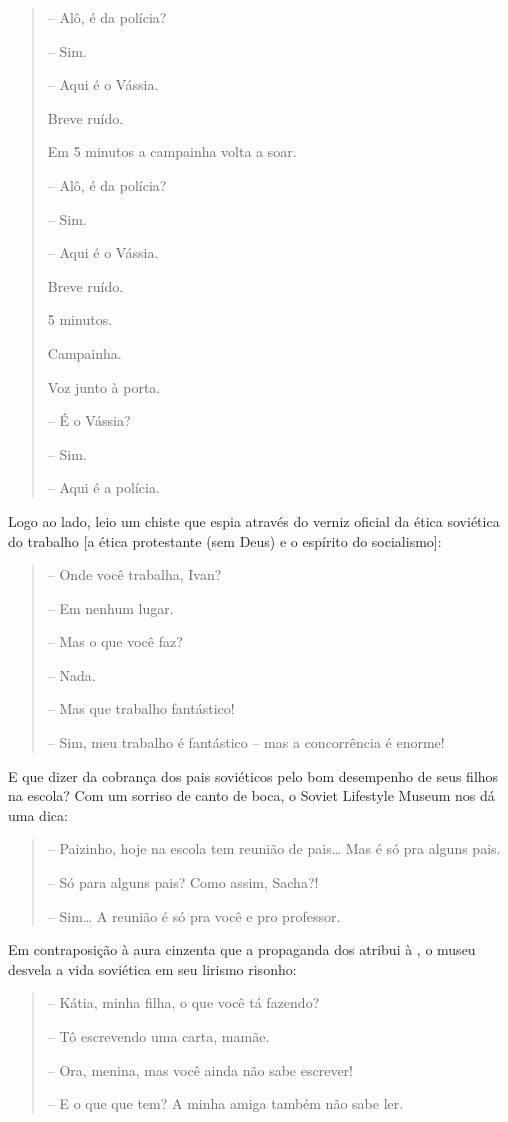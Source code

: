 \begin{quote}
\forceindent{}-- Alô, é da polícia?

-- Sim.

-- Aqui é o Vássia.

Breve ruído.

Em 5 minutos a campainha volta a soar.

-- Alô, é da polícia?

-- Sim.

-- Aqui é o Vássia.

Breve ruído.

5 minutos.

Campainha.

Voz junto à porta.

-- É o Vássia?

-- Sim.

-- Aqui é a polícia.
\end{quote}

Logo ao lado, leio um chiste que espia através do verniz oficial da
ética soviética do trabalho {[}a ética protestante (sem Deus) e o
espírito do socialismo{]}:

\begin{quote}
\forceindent{}-- Onde você trabalha, Ivan?

-- Em nenhum lugar.

-- Mas o que você faz?

-- Nada.

-- Mas que trabalho fantástico!

-- Sim, meu trabalho é fantástico -- mas a concorrência é enorme!
\end{quote}

E que dizer da cobrança dos pais soviéticos pelo bom desempenho de seus
filhos na escola? Com um sorriso de canto de boca, o Soviet Lifestyle
Museum nos dá uma dica:

\begin{quote}
\forceindent{}-- Paizinho, hoje na escola tem reunião de pais\ldots{} Mas é só pra alguns
pais.

-- Só para alguns pais? Como assim, Sacha?!

-- Sim\ldots{} A reunião é só pra você e pro professor.
\end{quote}

Em contraposição à aura cinzenta que a propaganda dos  atribui à
, o museu desvela a vida soviética em seu lirismo risonho:

\begin{quote}
\forceindent{}-- Kátia, minha filha, o que você tá fazendo?

-- Tô escrevendo uma carta, mamãe.

-- Ora, menina, mas você ainda não sabe escrever!

-- E o que que tem? A minha amiga também não sabe ler.
\end{quote}

